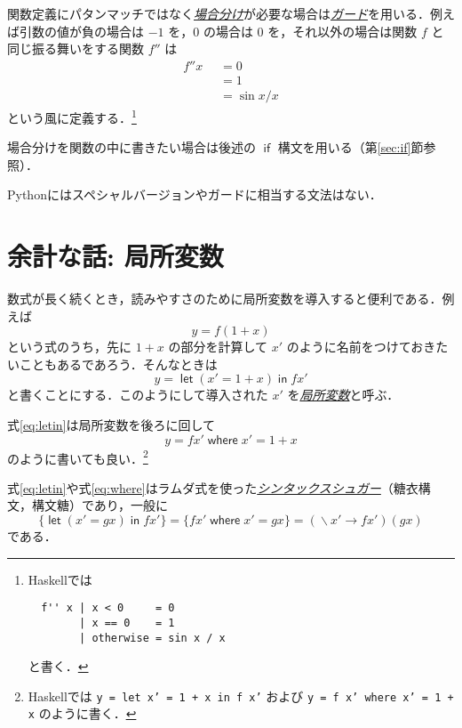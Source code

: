 \documentclass[a4paper,draft]{jsbook}
\newcommand{\programminglanguage}[1]{\textsf{#1}}
\newcommand{\haskell}{\programminglanguage{Haskell}}
\newcommand{\python}{\programminglanguage{Python}}
\newcommand{\keyword}[1]{{\underline{\emph{#1}}}}
\newcommand{\code}[1]{\texttt{#1}}
\newcommand{\mKeyword}[1]{\mathsf{#1}}
\newcommand{\mIfKeyword}{\mKeyword{if}}
\newcommand{\mLetKeyword}{\mKeyword{let}}
\newcommand{\mInKeyword}{\mKeyword{in}}
\newcommand{\mWhereKeyword}{\mKeyword{where}}
\newcommand{\mGuard}[1]{\mathop{\mid_{#1}}}
\DeclareMathOperator{\mLambda}{\backslash}
\DeclareMathOperator{\mLambdaArrow}{\rightarrow}
\DeclareMathOperator{\mIf}{\mIfKeyword}
\DeclareMathOperator{\mWhere}{\mWhereKeyword}
\DeclareMathOperator{\mLet}{\mLetKeyword} %
\DeclareMathOperator{\mInKW}{\mInKeyword} %
\newcommand{\mLetIn}[2]{\mLet{#1}\mInKW{#2}}
\newcommand{\mLambdaExp}[2]{\mLambda{#1}\mLambdaArrow{#2}}
\newcommand{\mathKeyword}[1]{\operatorname{\textsf{#1}}}
\newcommand{\mathOtherwise}{\mathKeyword{otherwise}}
\begin{document}
関数定義にパタンマッチではなく\keyword{場合分け}が必要な場合は\keyword{ガード}を用いる．例えば引数の値が負の場合は $-1$ を，$0$ の場合は $0$ を，それ以外の場合は関数 $f$ と同じ振る舞いをする関数 $f''$ は
\begin{equation}
\begin{split}
f''x&\mGuard{x<0}=0\\
&\mGuard{x\equiv 0}=1\\
&\mGuard{\mathOtherwise}=\sin x/x
\end{split}
\end{equation}
という風に定義する．\footnote{\haskell では
\begin{verbatim}
  f'' x | x < 0     = 0
        | x == 0    = 1
        | otherwise = sin x / x
\end{verbatim}
と書く．}

場合分けを関数の中に書きたい場合は後述の $\mIf$ 構文を用いる（第\ref{sec:if}節参照）．

\python にはスペシャルバージョンやガードに相当する文法はない．

\section{余計な話: 局所変数}

数式が長く続くとき，読みやすさのために局所変数を導入すると便利である．例えば
\begin{equation}
y=f(1+x)
\end{equation}
という式のうち，先に $1+x$ の部分を計算して $x'$ のように名前をつけておきたいこともあるであろう．そんなときは
\begin{equation}
\label{eq:letin}
y=\mLetIn{(x'=1+x)}{fx'}
\end{equation}
と書くことにする．このようにして導入された $x'$ を\keyword{局所変数}と呼ぶ．

式\eqref{eq:letin}は局所変数を後ろに回して
\begin{equation}
\label{eq:where}
y=fx'\mWhere x'=1+x
\end{equation}
のように書いても良い．\footnote{\haskell では \code{y = let x' = 1 + x in f x'} および \code{y = f x' where x' = 1 + x} のように書く．}

式\eqref{eq:letin}や式\eqref{eq:where}はラムダ式を使った\keyword{シンタックスシュガー}（糖衣構文，構文糖）であり，一般に
\begin{equation}
\{\mLetIn{(x'=gx)}{fx'}\}
=\{fx'\mWhere x'=gx\}
=(\mLambdaExp{x'}{fx'})(gx)
\end{equation}
である．
\end{document}
